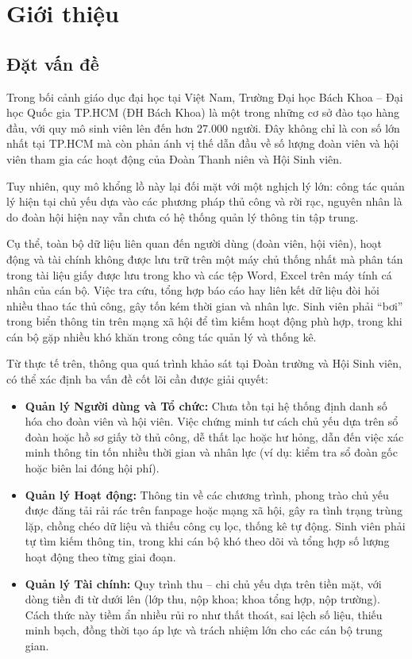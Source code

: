 \section{Giới thiệu}
\subsection{Đặt vấn đề}

Trong bối cảnh giáo dục đại học tại Việt Nam, Trường Đại học Bách Khoa -- Đại học Quốc gia TP.HCM (ĐH Bách Khoa) là một trong những cơ sở đào tạo hàng đầu, với quy mô sinh viên lên đến hơn 27.000 người. Đây không chỉ là con số lớn nhất tại TP.HCM mà còn phản ánh vị thế dẫn đầu về số lượng đoàn viên và hội viên tham gia các hoạt động của Đoàn Thanh niên và Hội Sinh viên.  

Tuy nhiên, quy mô khổng lồ này lại đối mặt với một nghịch lý lớn: công tác quản lý hiện tại chủ yếu dựa vào các phương pháp thủ công và rời rạc, nguyên nhân là do đoàn hội hiện nay vẫn chưa có hệ thống quản lý thông tin tập trung.

Cụ thể, toàn bộ dữ liệu liên quan đến người dùng (đoàn viên, hội viên), hoạt động và tài chính không được lưu trữ trên một máy chủ thống nhất mà phân tán trong tài liệu giấy được lưu trong kho và các tệp Word, Excel trên máy tính cá nhân của cán bộ. Việc tra cứu, tổng hợp báo cáo hay liên kết dữ liệu đòi hỏi nhiều thao tác thủ công, gây tốn kém thời gian và nhân lực. Sinh viên phải ``bơi'' trong biển thông tin trên mạng xã hội để tìm kiếm hoạt động phù hợp, trong khi cán bộ gặp nhiều khó khăn trong công tác quản lý và thống kê.

Từ thực tế trên, thông qua quá trình khảo sát tại Đoàn trường và Hội Sinh viên, có thể xác định ba vấn đề cốt lõi cần được giải quyết:

\begin{itemize}
    \item \textbf{Quản lý Người dùng và Tổ chức:}  
    Chưa tồn tại hệ thống định danh số hóa cho đoàn viên và hội viên. Việc chứng minh tư cách chủ yếu dựa trên sổ đoàn hoặc hồ sơ giấy tờ thủ công, dễ thất lạc hoặc hư hỏng, dẫn đến việc xác minh thông tin tốn nhiều thời gian và nhân lực (ví dụ: kiểm tra sổ đoàn gốc hoặc biên lai đóng hội phí).

    \item \textbf{Quản lý Hoạt động:}  
    Thông tin về các chương trình, phong trào chủ yếu được đăng tải rải rác trên fanpage hoặc mạng xã hội, gây ra tình trạng trùng lặp, chồng chéo dữ liệu và thiếu công cụ lọc, thống kê tự động. Sinh viên phải tự tìm kiếm thông tin, trong khi cán bộ khó theo dõi và tổng hợp số lượng hoạt động theo từng giai đoạn.

    \item \textbf{Quản lý Tài chính:}  
    Quy trình thu -- chi chủ yếu dựa trên tiền mặt, với dòng tiền đi từ dưới lên (lớp thu, nộp khoa; khoa tổng hợp, nộp trường). Cách thức này tiềm ẩn nhiều rủi ro như thất thoát, sai lệch số liệu, thiếu minh bạch, đồng thời tạo áp lực và trách nhiệm lớn cho các cán bộ trung gian.
\end{itemize}

